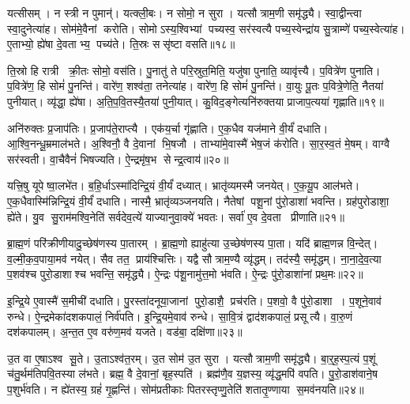 यत्सीसम्।
न स्त्री न पुमान्॑।
यत्क्ली॒बः।
न सोमो॒ न सुरा।
यत्सौत्राम॒णी समृ॑द्ध्यै।
स्वा॒द्वीन्त्वा स्वा॒दुनेत्या॑ह।
सोम॑मे॒वैनां करोति।
सोमोऽस्य॒श्विभ्यां पच्यस्व॒ सर॑स्वत्यै पच्य॒स्वेन्द्रा॑य सु॒त्राम्णे॑ पच्य॒स्वेत्या॑ह।
ए॒ताभ्यो॒ ह्ये॑षा दे॒वताभ्य॒ पच्य॑ते।
ति॒स्रः ससृ॑ष्टा वसति॥१८॥

ति॒स्रो हि रात्री क्री॒तः सोमो॒ वस॑ति।
पु॒नातु॑ ते परि॒स्रुत॒मिति॒ यजु॑षा पुनाति॒ व्यावृ॑त्त्यै।
प॒वित्रे॑ण पुनाति।
प॒वित्रे॑ण॒ हि सोमं॑ पु॒नन्ति॑।
वारे॑ण॒ शश्व॑ता॒ तनेत्या॑ह।
वारे॑ण॒ हि सोमं॑ पु॒नन्ति॑।
वा॒युः पू॒तः प॒वित्रे॒णेति॒ नैतया॑ पुनीयात्।
व्यृ॑द्धा॒ ह्ये॑षा।
अ॒ति॒प॒वि॒तस्यै॒तया॑ पुनी॒यात्।
कु॒विद॒ङ्गेत्यनि॑रुक्तया प्राजाप॒त्यया॑ गृह्णाति॥१९॥

अनि॑रुक्तः प्र॒जाप॑तिः।
प्र॒जाप॑ते॒राप्त्यै।
एक॑य॒र्चा गृ॑ह्णाति।
ए॒क॒धैव यज॑माने वी॒र्यं॑ दधाति।
आ॒श्वि॒नन्धू॒म्रमाल॑भते।
अ॒श्विनौ॒ वै दे॒वानां भि॒षजौ।
ताभ्या॑मे॒वास्मै॑ भेष॒जं क॑रोति।
सा॒र॒स्व॒तं मे॒षम्।
वाग्वै सर॑स्वती।
वा॒चैवैनं॑ भिषज्यति।
ऐ॒न्द्रमृ॑ष॒भ सेन्द्र॒त्वाय॑॥२०॥\anuvakamend[अक्ष्यो॒र्लोमा॑नि॒ हिर॑ण्यं वसति गृह्णाति भिषज्य॒त्येकं च]

यत्त्रि॒षु यूपेष्वा॒लभे॑त।
ब॒हि॒र्धाऽस्मा॑दिन्द्रि॒यं वी॒र्यं॑ दध्यात्।
भ्रातृ॑व्यमस्मै जनयेत्।
ए॒क॒यू॒प आल॑भते।
ए॒क॒धैवास्मि॑न्निन्द्रि॒यं वी॒र्यं॑ दधाति।
नास्मै॒ भ्रातृ॑व्यञ्जनयति।
नैतेषां पशू॒नां पु॑रो॒डाशा॑ भवन्ति।
ग्रह॑पुरोडाशा॒ ह्ये॑ते।
यु॒व सु॒राम॑मश्वि॒नेति॑ सर्वदेव॒त्ये॑ याज्यानुवा॒क्ये॑ भवतः।
सर्वा॑ ए॒व दे॒वता प्रीणाति॥२१॥

ब्रा॒ह्म॒णं परि॑क्रीणीयादु॒च्छेष॑णस्य पा॒तारम्।
ब्रा॒ह्म॒णो ह्याहु॑त्या उ॒च्छेष॑णस्य पा॒ता।
यदि॑ ब्राह्म॒णन्न वि॒न्देत्।
व॒ल्मी॒क॒व॒पाया॒मव॑ नयेत्।
सैव तत॒ प्राय॑श्चित्तिः।
यद्वै सौत्राम॒ण्यै व्यृ॑द्धम्।
तद॑स्यै॒ समृ॑द्धम्।
ना॒ना॒दे॒व॒त्या प॒शव॑श्च पुरो॒डाशाश्च भवन्ति॒ समृ॑द्ध्यै।
ऐ॒न्द्रः प॑शू॒नामु॑त्त॒मो भ॑वति।
ऐ॒न्द्रः पु॑रो॒डाशा॑नां प्रथ॒मः॥२२॥

इ॒न्द्रि॒ये ए॒वास्मै॑ स॒मीची॑ दधाति।
पु॒रस्ता॑दनूया॒जानां पुरो॒डाशै॒ प्रच॑रति।
प॒शवो॒ वै पु॑रो॒डाशा।
प॒शूने॒वाव॑ रुन्धे।
ऐ॒न्द्रमेका॑दशकपालं॒ निर्व॑पति।
इ॒न्द्रि॒यमे॒वाव॑ रुन्धे।
सा॒वि॒त्रं द्वाद॑शकपालं॒ प्रसूत्यै।
वा॒रु॒णं दश॑कपालम्।
अ॒न्त॒त ए॒व वरु॑ण॒मव॑ यजते।
वड॑बा॒ दक्षि॑णा॥२३॥

उ॒त वा ए॒षाऽश्व सू॒ते।
उ॒ताऽश्व॑त॒रम्।
उ॒त सोम॑ उ॒त सुरा।
यत्सौत्राम॒णी समृ॑द्ध्यै।
बा॒र्॒ह॒स्प॒त्यं प॒शूं च॑तु॒र्थम॑तिपवि॒तस्या ल॑भते।
ब्रह्म॒ वै दे॒वानां॒ बृह॒स्पति॑।
ब्रह्म॑णै॒व य॒ज्ञस्य॒ व्यृ॑द्ध॒मपि॑ वपति।
पु॒रो॒डाश॑वाने॒ष प॒शुर्भ॑वति।
न ह्ये॑तस्य॒ ग्रहं॑ गृ॒ह्णन्ति॑।
सोम॑प्रतीकाः पितरस्तृप्णु॒तेति॑ शतातृ॒ण्णाया स॒मव॑नयति॥२४॥

